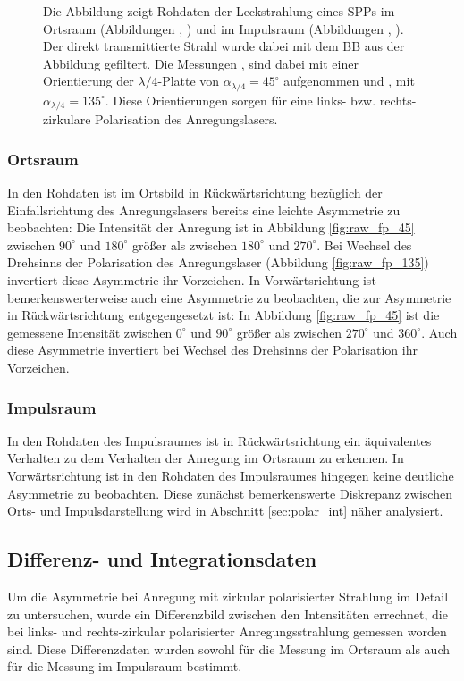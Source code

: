 \documentclass[a4paper, titlepage,  ngerman]{book}
\begin{document}
\begin{figure}
\begin{subfigure}{0.5\textwidth}
		\end{subfigure}
		\caption[Rohdaten PSHE]{Die Abbildung zeigt Rohdaten der Leckstrahlung eines SPPs im Ortsraum (Abbildungen , ) und im Impulsraum (Abbildungen , ). Der direkt transmittierte Strahl wurde dabei mit dem BB aus der Abbildung gefiltert. Die Messungen ,  sind dabei mit einer Orientierung der $\lambda / 4$-Platte von $\alpha_{\lambda/4} = 45^\circ$ aufgenommen und ,  mit $\alpha_{\lambda/4} = 135^\circ$. Diese Orientierungen sorgen für eine links- bzw. rechts-zirkulare Polarisation des Anregungslasers.}
		\label{fig:measure_pshe_raw}			
	\end{figure}
	\subsubsection{Ortsraum}
	In den Rohdaten ist im Ortsbild in Rückwärtsrichtung bezüglich der Einfallsrichtung des Anregungslasers bereits eine leichte Asymmetrie zu beobachten: Die Intensität der Anregung ist in Abbildung \ref{fig:raw_fp_45} zwischen $90^\circ$ und $180^\circ$ größer als zwischen $180^\circ$ und $270^\circ$. Bei Wechsel des Drehsinns der Polarisation des Anregungslaser (Abbildung \ref{fig:raw_fp_135}) invertiert diese Asymmetrie ihr Vorzeichen. In Vorwärtsrichtung ist bemerkenswerterweise auch eine Asymmetrie zu beobachten, die zur Asymmetrie in Rückwärtsrichtung entgegengesetzt ist: In Abbildung \ref{fig:raw_fp_45} ist die gemessene Intensität zwischen $0^\circ$ und $90^\circ$ größer als zwischen $270^\circ$ und $360^\circ$. Auch diese Asymmetrie invertiert bei Wechsel des Drehsinns der Polarisation ihr Vorzeichen. 
	\subsubsection{Impulsraum} 
	In den Rohdaten des Impulsraumes ist in Rückwärtsrichtung ein äquivalentes Verhalten zu dem Verhalten der Anregung im Ortsraum zu erkennen. In Vorwärtsrichtung ist in den Rohdaten des Impulsraumes hingegen keine deutliche Asymmetrie zu beobachten. Diese zunächst bemerkenswerte Diskrepanz zwischen Orts- und Impulsdarstellung wird in Abschnitt \ref{sec:polar_int} näher analysiert.
	\subsection{Differenz- und Integrationsdaten}
		Um die Asymmetrie bei Anregung mit zirkular polarisierter Strahlung im Detail zu untersuchen, wurde ein Differenzbild zwischen den Intensitäten errechnet, die bei links- und rechts-zirkular polarisierter Anregungsstrahlung gemessen worden sind. Diese Differenzdaten wurden sowohl für die Messung im Ortsraum als auch für die Messung im Impulsraum bestimmt.			
\end{document}
